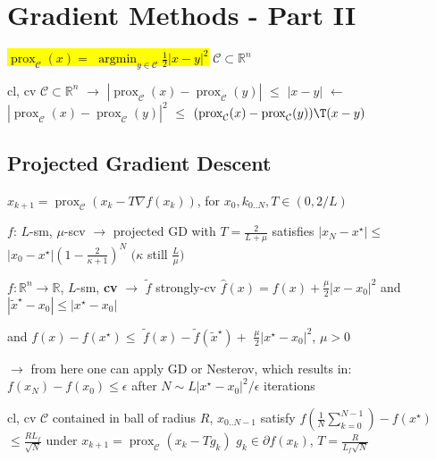 \section{Gradient Methods - Part II}

\begin{definition}[]

	\textcolor{hltext}{\hl{ $\operatorname{prox}_\mathcal{C}(x)=$
	$\operatorname{argmin}_{y\in\mathcal{C}}\frac{1}{2}|x-y|^2$ }}
	$\mathcal{C}\subset \mathbb{R}^{n}$
\end{definition}

\begin{lemma}
	cl, cv
	$\mathcal{C}\subset \mathbb{R}^{n}$
	$\rightarrow$
	$|\operatorname{prox}_\mathcal{C}(x)-\operatorname{prox}_\mathcal{C}(y)|$
	$\le$
	$|x-y|$
	$\leftarrow$
	$|\operatorname{prox}_\mathcal{C}(x)-\operatorname{prox}_\mathcal{C}(y)|^2$
	$\le$
	$(\operatorname{prox}_\mathcal{C}(x)-\operatorname{prox}_\mathcal{C}(y))\T(x-y)$
\end{lemma}


\subsection{Projected Gradient Descent}

$x_{k+1}=\operatorname{prox}_\mathcal{C}(x_k-T\nabla f(x_k))$,
for $x_0,k_{0..N},T\in(0,2/L)$

\begin{proposition}
	$f$: $L$-sm, $\mu$-scv
	$\rightarrow$
	projected GD with
	$T=\frac{2}{L+\mu}$
	satisfies
	$|x_N - x^\star|\le$
	$|x_0 - x^\star|(1-\frac{2}{\kappa+1})^N$
	$(\kappa$ still $\frac{L}{\mu})$
\end{proposition}

\begin{lemma}
	$f:\mathbb{R}^{n}\rightarrow\mathbb{R}$, $L$-sm, \textbf{cv}
	$\rightarrow$
	$\tilde{f}$
	strongly-cv
	$\hat{f}(x) = f(x)+\frac{\mu}{2}|x-x_0|^2$
	and
	$|\tilde{x}^\star-x_0|\le|x^\star-x_0|$

	and
	$f(x)-f(x^\star)\le$
	$\tilde{f}(x)-\tilde{f}(\tilde{x}^\star)+$
	$\frac{\mu}{2}|x^\star-x_0|^2$,
	$\mu>0$
\end{lemma}

$\rightarrow$ from here one can apply GD or Nesterov, which results in:
$f(x_N)-f(x_0)\le\epsilon$
after
$N\sim L|x^\star-x_0|^2/\epsilon$
iterations

\begin{proposition}
	cl, cv $\mathcal{C}$
	contained in ball of radius $R$,
	$x_{0..N-1}$ satisfy
	$f(\frac{1}{N}\sum_{k=0}^{N-1})-f(x^\star)$
	$\le\frac{RL_f}{\sqrt{N}}$
	under
	$x_{k+1} = \operatorname{prox}_\mathcal{C}(x_k-Tg_k)$
	$g_k\in\partial f(x_k)$,
	$T = \frac{R}{L_f\sqrt{N}}$
\end{proposition}

